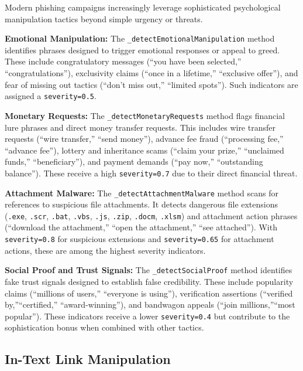 Modern phishing campaigns increasingly leverage sophisticated
psychological manipulation tactics beyond simple urgency or threats.

\textbf{Emotional Manipulation:} The \texttt{\_detectEmotionalManipulation}
method identifies phrases designed to trigger emotional responses or appeal
to greed. These include congratulatory messages (``you have been selected,''
``congratulations''), exclusivity claims (``once in a lifetime,'' ``exclusive
offer''), and fear of missing out tactics (``don't miss out,'' ``limited
spots''). Such indicators are assigned a \texttt{severity=0.5}.

\textbf{Monetary Requests:} The \texttt{\_detectMonetaryRequests} method
flags financial lure phrases and direct money transfer requests. This
includes wire transfer requests (``wire transfer,'' ``send money''), advance
fee fraud (``processing fee,'' ``advance fee''), lottery and inheritance
scams (``claim your prize,'' ``unclaimed funds,'' ``beneficiary''), and
payment demands (``pay now,'' ``outstanding balance''). These receive a
high \texttt{severity=0.7} due to their direct financial threat.

\textbf{Attachment Malware:} The \texttt{\_detectAttachmentMalware} method
scans for references to suspicious file attachments. It detects dangerous
file extensions (\texttt{.exe}, \texttt{.scr}, \texttt{.bat}, \texttt{.vbs},
\texttt{.js}, \texttt{.zip}, \texttt{.docm}, \texttt{.xlsm}) and attachment
action phrases (``download the attachment,'' ``open the attachment,'' ``see
attached''). With \texttt{severity=0.8} for suspicious extensions and
\texttt{severity=0.65} for attachment actions, these are among the highest
severity indicators.

\textbf{Social Proof and Trust Signals:} The
\texttt{\_detectSocialProof} method identifies fake trust signals designed
to establish false credibility. These include popularity claims (``millions
of users,'' ``everyone is using''), verification assertions (``verified by,''``certified,'' ``award-winning''), and bandwagon appeals (``join millions,''``most popular''). These indicators receive a lower \texttt{severity=0.4}
but contribute to the sophistication bonus when combined with other
tactics.

\subsection{In-Text Link
Manipulation}\label{in-text-link-manipulation}

